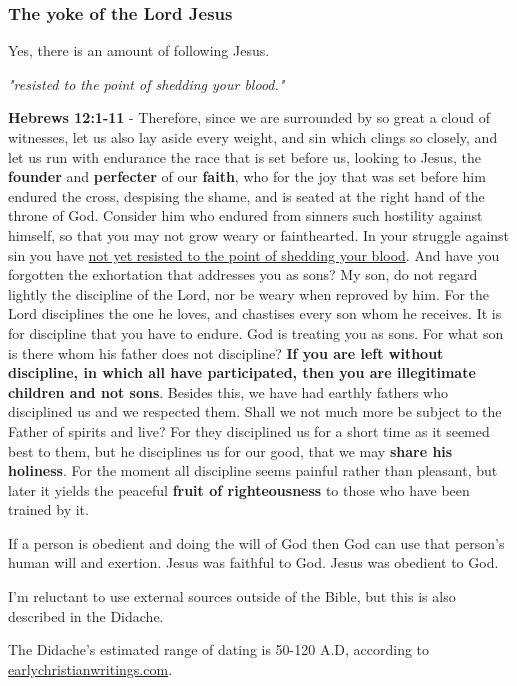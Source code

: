 \documentclass[11pt]{article}
\begin{document}
\subsubsection{The yoke of the Lord Jesus}
\label{sec:org5239fd0}
Yes, there is an amount of following Jesus.

\emph{"resisted to the point of shedding your blood."}

\textbf{Hebrews 12:1-11} - Therefore, since we are surrounded by so great a cloud of witnesses, let us also lay aside every weight, and sin which clings so closely, and let us run with endurance the race that is set before us, looking to Jesus, the \textbf{founder} and \textbf{perfecter} of our \textbf{faith}, who for the joy that was set before him endured the cross, despising the shame, and is seated at the right hand of the throne of God. Consider him who endured from sinners such hostility against himself, so that you may not grow weary or fainthearted. In your struggle against sin you have \uline{not yet resisted to the point of shedding your blood}. And have you forgotten the exhortation that addresses you as sons? My son, do not regard lightly the discipline of the Lord, nor be weary when reproved by him. For the Lord disciplines the one he loves, and chastises every son whom he receives. It is for discipline that you have to endure. God is treating you as sons. For what son is there whom his father does not discipline? \textbf{If you are left without discipline, in which all have participated, then you are illegitimate children and not sons}. Besides this, we have had earthly fathers who disciplined us and we respected them. Shall we not much more be subject to the Father of spirits and live? For they disciplined us for a short time as it seemed best to them, but he disciplines us for our good, that we may \textbf{share his holiness}. For the moment all discipline seems painful rather than pleasant, but later it yields the peaceful \textbf{fruit of righteousness} to those who have been trained by it.

If a person is obedient and doing the will of God then God can use that person's human will and exertion. Jesus was faithful to God. Jesus was obedient to God.

I'm reluctant to use external sources outside of the Bible, but this is also described in the Didache.

The Didache's estimated range of dating is 50-120 A.D, according to \href{https://www.earlychristianwritings.com/text/didache-roberts.html}{earlychristianwritings.com}.
\end{document}

